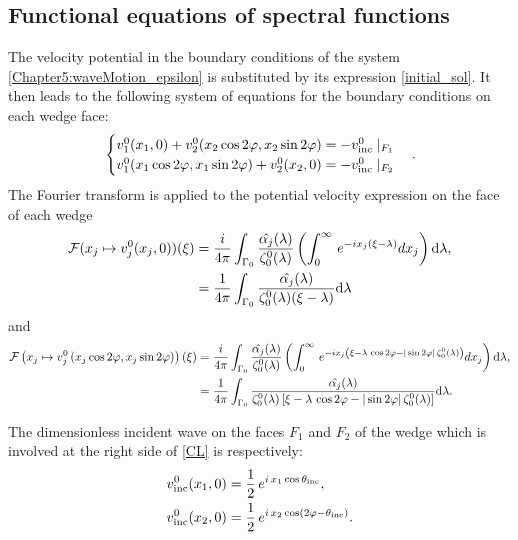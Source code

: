 \subsection{Functional equations of spectral functions}

The velocity potential in the boundary conditions of the system \eqref{Chapter5:waveMotion_epsilon} is substituted by its expression \eqref{initial_sol}. It then leads to the following system of equations for the boundary conditions on each wedge face:
\begin{equation}
\label{CL}
\begin{cases}
v_1^0(x_1,0) + v_2^0(x_2 \cos 2\varphi,x_2 \sin 2\varphi)  =  -v^0_{\rm inc} \mid_{F_1}\\
v_1^0(x_1 \cos 2\varphi,x_1 \sin 2\varphi) + v_2^0(x_2,0)   =  -v^0_{\rm inc} \mid_{F_2}
\end{cases}.
\end{equation}
The Fourier transform is applied to the potential velocity expression on the face of each wedge 
\begin{align}
\mathcal{F}(x_j \mapsto v_j^0 (x_j,0))(\xi) & =  \dfrac{i}{4\pi} \int_{\Gamma_0}  \dfrac{\hat{\alpha_j}(\lambda)}{\zeta_0^0(\lambda)}  \left( \int_0^{\infty} \, e^{-i x_j (\xi-\lambda)} dx_j \right) {\rm d} \lambda,\\
& =  \dfrac{1}{4\pi} \int_{\Gamma_0} \dfrac{\hat{\alpha_j}(\lambda)}{\zeta_0^0(\lambda) (\xi - \lambda)} {\rm d} \lambda \nonumber
\end{align}
and
\begin{align}
\mathcal{F} \left( x_j \mapsto v_j^0 \left( x_j \cos 2\varphi,x_j \sin 2\varphi \right) \right)(\xi)  & =  \dfrac{i}{4\pi} \int_{\Gamma_0}  \dfrac{\hat{\alpha_j}(\lambda)}{\zeta_0^0(\lambda)}  \left( \int_0^{\infty} \, e^{-i x_j \left( \xi - \lambda  \, \cos 2\varphi - |\sin 2\varphi| \, \zeta_0^0(\lambda) \right)} dx_j \right) {\rm d} \lambda,\\
& = \dfrac{1}{4\pi} \int_{\Gamma_0} \dfrac{ \hat{\alpha_j}(\lambda)}{\zeta_0^0(\lambda) \left[ \xi - \lambda \, \cos 2\varphi  - |\sin 2\varphi| \, \zeta_0^0(\lambda) \right]} {\rm d} \lambda.  \nonumber
\end{align}


The dimensionless incident wave on the faces $F_1$ and $F_2$ of the wedge which is involved at the right side of \eqref{CL} is respectively:
\begin{subequations}
\label{CL2}
\begin{align}
v^0_{\rm inc}(x_1,0) & =  \dfrac{1}{2} \, e^{i \, x_1 \cos \theta_{\rm inc}} ,\\
v^0_{\rm inc}(x_2,0) & =   \dfrac{1}{2} \, e^{i \, x_2 \cos (2\varphi - \theta_{\rm inc} )} .
\end{align}
\end{subequations}

